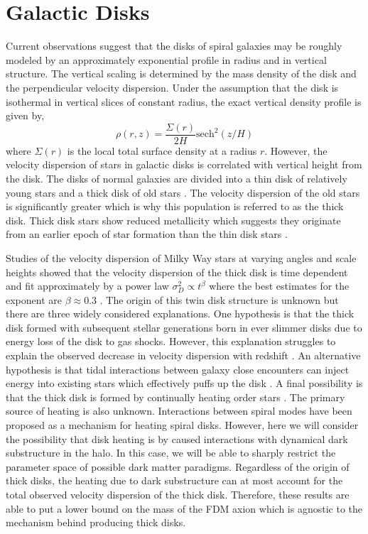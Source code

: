 \documentclass[usenatbib]{mnras}
\begin{document}
\section{Galactic Disks}

\hspace{5mm} Current observations suggest that the disks of spiral galaxies may be roughly modeled by an approximately exponential profile in radius and in vertical structure. The vertical scaling is determined by the mass density of the disk and the perpendicular velocity dispersion. Under the assumption that the disk is isothermal in vertical slices of constant radius, the exact vertical density profile is given by,
\begin{equation}
\rho(r, z) =  \frac{\Sigma(r)}{2H} \mathrm{sech}^2{(z/H)} 
\end{equation} 
where $\Sigma(r)$ is the local total surface density at a radius $r$.
However, the velocity dispersion of stars in galactic disks is correlated with vertical height from the disk. The disks of normal galaxies are divided into a thin disk of relatively young stars and a thick disk of old stars \citep{binney_tremaine_2008}.  The velocity dispersion of the old stars is significantly greater which is why this population is referred to as the thick disk. Thick disk stars show reduced metallicity which suggests they originate from an earlier epoch of star formation than the thin disk stars \citep{binney_tremaine_2008}. 
\par
Studies of the velocity dispersion of Milky Way stars at varying angles and scale heights showed that the velocity dispersion of the thick disk is time dependent and fit approximately by a power law $\sigma_D^2 \propto t^{\beta}$ where the best estimates for the exponent are $\beta \approx 0.3$ \citep{heating_history}. The origin of this twin disk structure is unknown but there are three widely considered explanations. One hypothesis is that the thick disk formed with subsequent stellar generations born in ever slimmer disks due to energy loss of the disk to gas shocks. However, this explanation struggles to explain the observed decrease in velocity dispersion with redshift \citep{emergence-thick-disk}. An alternative hypothesis is that tidal interactions between galaxy close encounters can inject energy into existing stars which effectively puffs up the disk \citep{thick-disk-mergers}. A final possibility is that the thick disk is formed by continually heating order stars \citep{thin-and-thick-disk}. The primary source of heating is also unknown. Interactions between spiral modes have been proposed as a mechanism for heating spiral disks. However, here we will consider the possibility that disk heating is by caused interactions with dynamical dark substructure in the halo. In this case, we will be able to sharply restrict the parameter space of possible dark matter paradigms. Regardless of the origin of thick disks, the heating due to dark substructure can at most account for the total observed velocity dispersion of the thick disk. Therefore, these results are able to put a lower bound on the mass of the FDM axion which is agnostic to the mechanism behind producing thick disks.
\end{document}
